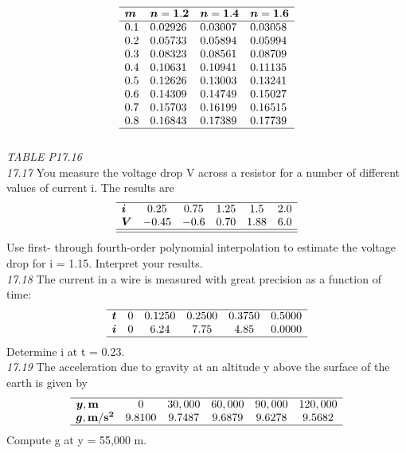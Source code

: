 \documentclass[../main.tex]{subfiles}
\begin{document}
\begin{multicols}{2}
$$
\begin{array}{llll}
\hline \boldsymbol{m} & \boldsymbol{n}=\mathbf{1 . 2} & \boldsymbol{n}=\mathbf{1 . 4} & \boldsymbol{n}=\mathbf{1 . 6} \\
\hline 0.1 & 0.02926 & 0.03007 & 0.03058 \\
0.2 & 0.05733 & 0.05894 & 0.05994 \\
0.3 & 0.08323 & 0.08561 & 0.08709 \\
0.4 & 0.10631 & 0.10941 & 0.11135 \\
0.5 & 0.12626 & 0.13003 & 0.13241 \\
0.6 & 0.14309 & 0.14749 & 0.15027 \\
0.7 & 0.15703 & 0.16199 & 0.16515 \\
0.8 & 0.16843 & 0.17389 & 0.17739 \\
\hline\\
\end{array}
$$
\noindent\textit{TABLE P17.16}\\
\noindent\textit{17.17} You measure the voltage drop V across a resistor for a
number of different values of current i. The results are
$$
\begin{array}{lccccc}
\hline \boldsymbol{i} & 0.25 & 0.75 & 1.25 & 1.5 & 2.0 \\
\boldsymbol{V} & -0.45 & -0.6 & 0.70 & 1.88 & 6.0 \\
\hline \hline
\end{array}
$$
Use first- through fourth-order polynomial interpolation to
estimate the voltage drop for i = 1.15. Interpret your results.\\

\noindent\textit{17.18} The current in a wire is measured with great precision
as a function of time:
$$
\begin{array}{lccccc}
\hline \boldsymbol{t} & 0 & 0.1250 & 0.2500 & 0.3750 & 0.5000 \\
\boldsymbol{i} & 0 & 6.24 & 7.75 & 4.85 & 0.0000 \\
\hline
\end{array}
$$
Determine i at t = 0.23.\\

\noindent\textit{17.19} The acceleration due to gravity at an altitude y above
the surface of the earth is given by
$$
\begin{array}{lccccc}
\hline \boldsymbol{y}, \mathbf{m} & 0 & 30,000 & 60,000 & 90,000 & 120,000 \\
\boldsymbol{g}, \mathbf{m} / \mathbf{s}^{\mathbf{2}} & 9.8100 & 9.7487 & 9.6879 & 9.6278 & 9.5682 \\
\hline
\end{array}
$$
Compute g at y = 55,000 m.\\


\end{multicols}
\end{document}

